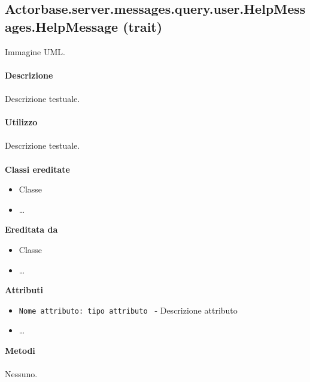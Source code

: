 \documentclass[a4paper]{article}
\begin{document}
	\subsection{Actorbase.server.messages.query.user.HelpMessages.HelpMessage (trait)}
		Immagine UML.
		\\ \\
		\textbf{Descrizione}
			\\ \\
			Descrizione testuale.
			\\ \\
		\textbf{Utilizzo}
			\\ \\
			Descrizione testuale.
			\\ \\
		\textbf{Classi ereditate}
			\begin{itemize}
				\item Classe
				\item \dots
			\end{itemize}
		\textbf{Ereditata da}
			\begin{itemize}
				\item Classe
				\item \dots
			\end{itemize}
		\textbf{Attributi}
			\begin{itemize}
				\item \texttt{Nome attributo: tipo attributo } - Descrizione attributo
				\item \dots
			\end{itemize}
		\textbf{Metodi}
			\\ \\
			Nessuno.	
			
\end{document}

